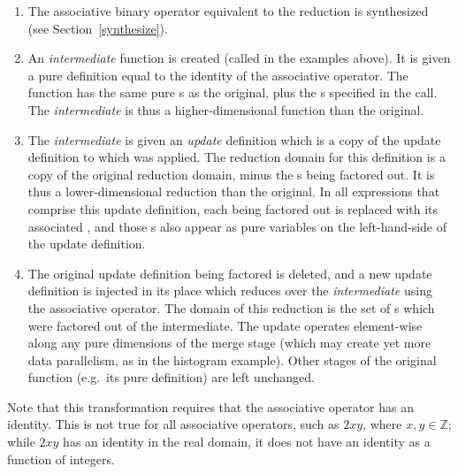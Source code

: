 \begin{enumerate}
\item The associative binary operator equivalent to the reduction is synthesized (see Section~\ref{synthesize}).
\item An \emph{intermediate} function is created (called  in the examples above). It is given a pure definition equal to the identity of the associative operator. The function has the same pure s as the original, plus the s specified in the  call. The \emph{intermediate} is thus a higher-dimensional function than the original.
\item The \emph{intermediate} is given an \emph{update} definition which is a copy of the update definition to which  was applied. The reduction domain for this definition is a copy of the original reduction domain, minus the s being factored out. It is thus a lower-dimensional reduction than the original. In all expressions that comprise this update definition, each  being factored out is replaced with its associated , and those s also appear as pure variables on the left-hand-side of the update definition.
\item The original update definition being factored is deleted, and a new update definition is injected in its place which reduces over the \emph{intermediate} using the associative operator. The domain of this reduction is the set of s which were factored out of the intermediate. The update operates element-wise along any pure dimensions of the merge stage (which may create yet more data parallelism, as in the histogram example). Other stages of the original function (e.g.\ its pure definition) are left unchanged.
\end{enumerate}

Note that this transformation requires that the associative operator has an identity. This is not true for all associative operators, such as $2xy$, where $x, y \in \mathds{Z}$; while $2xy$ has an identity in the real domain, it does not have an identity as a function of integers.
